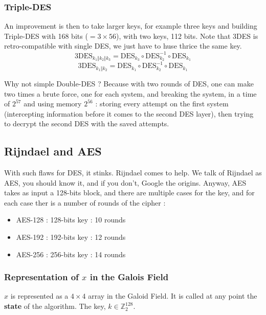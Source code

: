 \documentclass[../Cryptography.tex]{subfiles}
\begin{document}
\subsubsection{Triple-DES}
An improvement is then to take larger keys, for example three keys and building Triple-DES with 168 bits ($= 3\times 56$), with two keys, 112 bits. Note that 3DES is retro-compatible with single DES, we just have to huse thrice the same key.
$$3\mathrm{DES}_{k_1\Vert k_2\Vert k_3} = \mathrm{DES}_{k_3} \circ \mathrm{DES}_{k_2} ^{-1} \circ \mathrm{DES}_{k_1} $$
$$3\mathrm{DES}_{k_1\Vert k_2} = \mathrm{DES}_{k_1} \circ \mathrm{DES}_{k_2} ^{-1} \circ \mathrm{DES}_{k_1} $$

Why not simple Double-DES ? Because with two rounds of DES, one can make two times a brute force, one for each system, and breaking the system, in a time of $2^{57}$ and using memory $2^{56}$ : storing every attempt on the first system (intercepting information before it comes to the second DES layer), then trying to decrypt the second DES with the saved attempts.

\subsection{Rijndael and AES}
With such flaws for DES, it stinks. Rijndael comes to help. We talk of Rijndael as AES, you should know it, and if you don't, Google the origins. Anyway, AES takes as input a 128-bits block, and there are multiple cases for the key, and for each case ther is a number of rounds of the cipher :
\begin{itemize}
    \item AES-128 : 128-bits key : 10 rounds
    \item AES-192 : 192-bits key : 12 rounds
    \item AES-256 : 256-bits key : 14 rounds
\end{itemize}
\subsubsection{Representation of $x$ in the Galois Field}
$x$ is represented as a $4\times 4$ array in the Galoid Field. It is called at any point the \textbf{state} of the algorithm. The key, $k\in \mathbb{Z}_2 ^{128}$. \\
\end{document}
